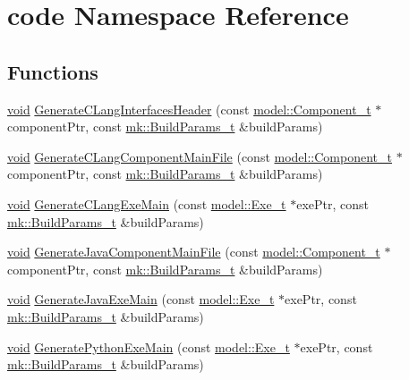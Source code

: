 \hypertarget{namespacecode}{}\section{code Namespace Reference}
\label{namespacecode}
\subsection*{Functions}
\begin{DoxyCompactItemize}
\item 
\hyperlink{_t_e_m_p_l_a_t_e__cdef_8h_ac9c84fa68bbad002983e35ce3663c686}{void} \hyperlink{namespacecode_aee3319f9074a33e4e5897c44112355cd}{Generate\+C\+Lang\+Interfaces\+Header} (const \hyperlink{structmodel_1_1_component__t}{model\+::\+Component\+\_\+t} $\ast$component\+Ptr, const \hyperlink{structmk_1_1_build_params__t}{mk\+::\+Build\+Params\+\_\+t} \&build\+Params)
\item 
\hyperlink{_t_e_m_p_l_a_t_e__cdef_8h_ac9c84fa68bbad002983e35ce3663c686}{void} \hyperlink{namespacecode_a4b3a0b3bddf1db4da31eef485f20ce5b}{Generate\+C\+Lang\+Component\+Main\+File} (const \hyperlink{structmodel_1_1_component__t}{model\+::\+Component\+\_\+t} $\ast$component\+Ptr, const \hyperlink{structmk_1_1_build_params__t}{mk\+::\+Build\+Params\+\_\+t} \&build\+Params)
\item 
\hyperlink{_t_e_m_p_l_a_t_e__cdef_8h_ac9c84fa68bbad002983e35ce3663c686}{void} \hyperlink{namespacecode_adcbe5a2adcd52e83fb49daee02728a1d}{Generate\+C\+Lang\+Exe\+Main} (const \hyperlink{structmodel_1_1_exe__t}{model\+::\+Exe\+\_\+t} $\ast$exe\+Ptr, const \hyperlink{structmk_1_1_build_params__t}{mk\+::\+Build\+Params\+\_\+t} \&build\+Params)
\item 
\hyperlink{_t_e_m_p_l_a_t_e__cdef_8h_ac9c84fa68bbad002983e35ce3663c686}{void} \hyperlink{namespacecode_a56d6fb24b6587ef20ccf801145496375}{Generate\+Java\+Component\+Main\+File} (const \hyperlink{structmodel_1_1_component__t}{model\+::\+Component\+\_\+t} $\ast$component\+Ptr, const \hyperlink{structmk_1_1_build_params__t}{mk\+::\+Build\+Params\+\_\+t} \&build\+Params)
\item 
\hyperlink{_t_e_m_p_l_a_t_e__cdef_8h_ac9c84fa68bbad002983e35ce3663c686}{void} \hyperlink{namespacecode_a28d9202f0ecdcee0373f031473ef0b27}{Generate\+Java\+Exe\+Main} (const \hyperlink{structmodel_1_1_exe__t}{model\+::\+Exe\+\_\+t} $\ast$exe\+Ptr, const \hyperlink{structmk_1_1_build_params__t}{mk\+::\+Build\+Params\+\_\+t} \&build\+Params)
\item 
\hyperlink{_t_e_m_p_l_a_t_e__cdef_8h_ac9c84fa68bbad002983e35ce3663c686}{void} \hyperlink{namespacecode_a4e4cbea8ca6ba1e29f150ca13e34dd8e}{Generate\+Python\+Exe\+Main} (const \hyperlink{structmodel_1_1_exe__t}{model\+::\+Exe\+\_\+t} $\ast$exe\+Ptr, const \hyperlink{structmk_1_1_build_params__t}{mk\+::\+Build\+Params\+\_\+t} \&build\+Params)

\end{DoxyCompactItemize}

